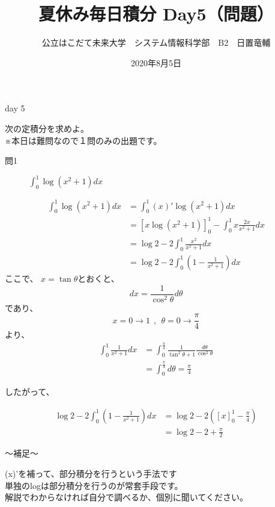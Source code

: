 \documentclass[dvipdfmx,uplatex]{jsarticle}
\title{夏休み毎日積分 Day5（問題）}
\author{公立はこだて未来大学　システム情報科学部　B2　日置竜輔}
\date{2020年8月5日}
\begin{document}
\maketitle

\begin{itembox}[c]{day 5}
    \begin{center}
        次の定積分を求めよ。\\
        ※本日は難問なので１問のみの出題です。
    \end{center}
\end{itembox}

\begin{description}
    \item [問1] $ \displaystyle \int_0^1 \log(x^2 + 1) dx $
\end{description}

\begin{align*}
    \int_0^1 \log(x^2 + 1) dx &= \int_0^1 (x)'\log(x^2 + 1) dx \\
        &= [x\log(x^2 + 1)]_0^1 - \int_0^1 x\frac{2x}{x^2 + 1} dx \\
        &= \log2 - 2\int_0^1\frac{x^2}{x^2 + 1} dx \\
        &= \log2 - 2\int_0^1 (1 - \frac{1}{x^2+1} ) dx
\end{align*}
ここで、 $ \displaystyle x = \tan{\theta} $とおくと、
\begin{equation*}
  dx = \frac{1}{\cos^2\theta}d{\theta}
\end{equation*}
であり、
\begin{equation*}
  x = 0 → 1 ~~,~~\theta = 0 → \frac{\pi}{4}
\end{equation*}
より、
\begin{align*}
    \int_0^1 \frac{1}{x^2 + 1} dx &= \int_0^\frac{\pi}{4} \frac{1}{\tan^2\theta + 1}\frac{d\theta}{\cos^2\theta} \\
    &= \int_0^\frac{\pi}{4} d\theta = \frac{\pi}{4}
\end{align*}

したがって、

\begin{align*}
    \log2 - 2\int_0^1 (1 - \frac{1}{x^2 + 1}) dx &= \log2 - 2([x]_0^1 - \frac{\pi}{4}) \\
    &= \log2 - 2 + \frac{\pi}{2}
\end{align*}

\begin{boxnote}
    〜補足〜
    \begin{center}
        (x)'を補って、部分積分を行うという手法です\\
        単独のlogは部分積分を行うのが常套手段です。 \\
        解説でわからなければ自分で調べるか、個別に聞いてください。
    \end{center}
\end{boxnote}
\end{document}
